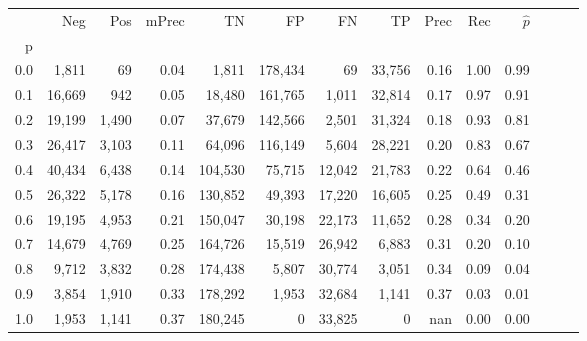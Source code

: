 \begin{tabular}{rrrrrrrrrrrrrr}
\toprule
{} &     Neg &    Pos & mPrec &       TN &       FP &      FN &      TP &  Prec &   Rec & $\hat{p}$ \\
p   &         &        &       &          &          &         &         &       &       &           \\
\midrule
0.0 &   1,811 &     69 &  0.04 &    1,811 &  178,434 &      69 &  33,756 &  0.16 &  1.00 &      0.99 \\
0.1 &  16,669 &    942 &  0.05 &   18,480 &  161,765 &   1,011 &  32,814 &  0.17 &  0.97 &      0.91 \\
0.2 &  19,199 &  1,490 &  0.07 &   37,679 &  142,566 &   2,501 &  31,324 &  0.18 &  0.93 &      0.81 \\
0.3 &  26,417 &  3,103 &  0.11 &   64,096 &  116,149 &   5,604 &  28,221 &  0.20 &  0.83 &      0.67 \\
0.4 &  40,434 &  6,438 &  0.14 &  104,530 &   75,715 &  12,042 &  21,783 &  0.22 &  0.64 &      0.46 \\
0.5 &  26,322 &  5,178 &  0.16 &  130,852 &   49,393 &  17,220 &  16,605 &  0.25 &  0.49 &      0.31 \\
0.6 &  19,195 &  4,953 &  0.21 &  150,047 &   30,198 &  22,173 &  11,652 &  0.28 &  0.34 &      0.20 \\
0.7 &  14,679 &  4,769 &  0.25 &  164,726 &   15,519 &  26,942 &   6,883 &  0.31 &  0.20 &      0.10 \\
0.8 &   9,712 &  3,832 &  0.28 &  174,438 &    5,807 &  30,774 &   3,051 &  0.34 &  0.09 &      0.04 \\
0.9 &   3,854 &  1,910 &  0.33 &  178,292 &    1,953 &  32,684 &   1,141 &  0.37 &  0.03 &      0.01 \\
1.0 &   1,953 &  1,141 &  0.37 &  180,245 &        0 &  33,825 &       0 &   nan &  0.00 &      0.00 \\
\bottomrule
\end{tabular}
